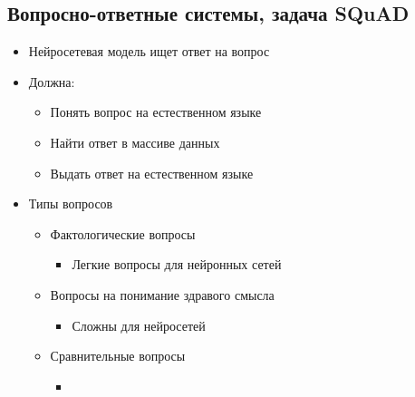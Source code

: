 \documentclass[a4paper, 12pt]{article}
\begin{document}
\subsection{Вопросно-ответные системы, задача
SQuAD}

\begin{itemize}
\item
  
  Нейросетевая модель ищет ответ на вопрос
  
\item
  
  Должна:
  

  \begin{itemize}
  \item
    
    Понять вопрос на естественном языке
    
  \item
    
    Найти ответ в массиве данных
    
  \item
    
    Выдать ответ на естественном языке
    
  \end{itemize}
\item
  
  Типы вопросов
  

  \begin{itemize}
  \item
    
    Фактологические вопросы
    

    \begin{itemize}
    \item
      
      Легкие вопросы для нейронных сетей
      
    \end{itemize}
  \item
    
    Вопросы на понимание здравого смысла
    

    \begin{itemize}
    \item
      
      Сложны для нейросетей
      
    \end{itemize}
  \item
    
    Сравнительные вопросы
    

    \begin{itemize}
    \item
      

\end{itemize}
\end{itemize}
\end{itemize}
\end{document}
